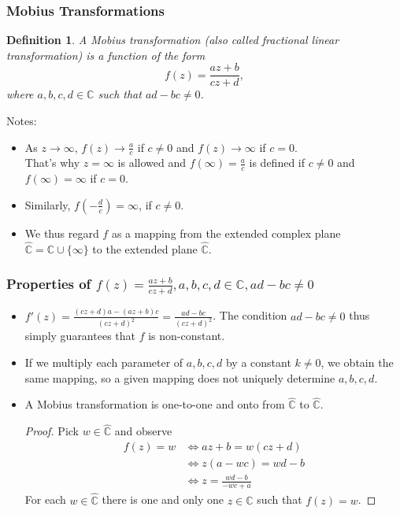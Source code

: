 \documentclass{article}
\newtheorem{definition}{Definition}[section]
\begin{document}
\subsubsection{Mobius Transformations}
\begin{definition}
A Mobius transformation (also called fractional linear transformation) is a function of the form
\begin{equation*}
f(z) = \frac{az + b}{cz + d},
\end{equation*}
where $a, b, c, d \in \mathbb{C}$ such that $ad - bc \neq 0$.
\end{definition}
Notes:
\begin{itemize}
\item As $z \to \infty$, $f(z) \to \frac{a}{c}$ if $c \neq 0$ and $f(z) \to \infty$ if $c = 0$. \\
That's why $z = \infty$ is allowed and $f(\infty) = \frac{a}{c}$ is defined if $c \neq 0$ and $f(\infty) = \infty$ if $c = 0$.
\item Similarly, $f(-\frac{d}{c}) = \infty$, if $c \neq 0$.
\item We thus regard $f$ as a mapping from the extended complex plane $\hat{\mathbb{C}} = \mathbb{C} \cup \{ \infty \} $ to the extended plane $\hat{\mathbb{C}}$.
\end{itemize}

\subsubsection{Properties of $f(z) = \frac{az + b}{cz + d}, a, b, c, d \in \mathbb{C}, ad - bc \neq 0$}
\begin{itemize}
\item $f'(z) = \frac{(cz + d)a - (az + b)c}{(cz + d)^2} = \frac{ad - bc}{(cz + d)^2}$. The condition $ad - bc \neq 0$ thus simply guarantees that $f$ is non-constant.
\item If we multiply each parameter of $a, b, c, d$ by a constant $k \neq 0$, we obtain the same mapping, so a given mapping does not uniquely determine $a, b, c, d$.
\item A Mobius transformation is one-to-one and onto from $\hat{\mathbb{C}}$ to $\hat{\mathbb{C}}$.
\begin{proof}
Pick $w \in \hat{\mathbb{C}}$ and observe
\begin{align*}
f(z) = w &\iff az + b = w(cz + d) \\
&\iff z(a - wc) = wd - b \\
&\iff z = \frac{wd - b}{-wc + a}
\end{align*}
For each $w \in \hat{\mathbb{C}}$ there is one and only one $z \in \hat{\mathbb{C}}$ such that $f(z) = w$.
\end{proof}
\end{itemize}
\end{document}
